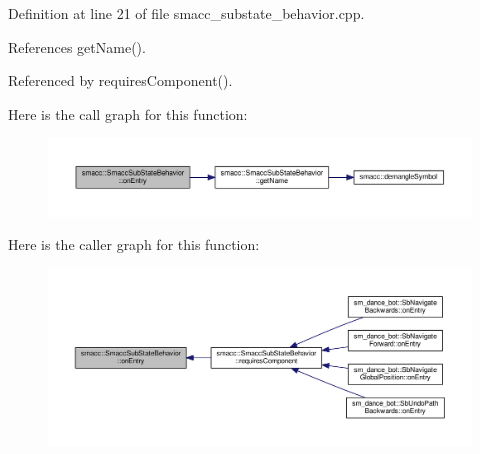 Definition at line 21 of file smacc\+\_\+substate\+\_\+behavior.\+cpp.



References get\+Name().



Referenced by requires\+Component().




Here is the call graph for this function\+:
\nopagebreak
\begin{figure}[H]
\begin{center}
\leavevmode
\includegraphics[width=350pt]{classsmacc_1_1SmaccSubStateBehavior_a47eb8983afa8e1d312873a9a297b84f3_cgraph}
\end{center}
\end{figure}




Here is the caller graph for this function\+:
\nopagebreak
\begin{figure}[H]
\begin{center}
\leavevmode
\includegraphics[width=350pt]{classsmacc_1_1SmaccSubStateBehavior_a47eb8983afa8e1d312873a9a297b84f3_icgraph}
\end{center}
\end{figure}


